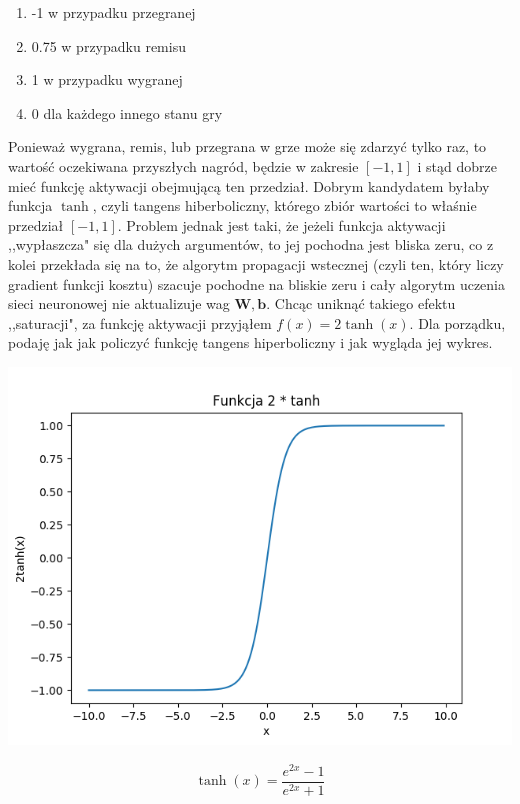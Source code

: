 \documentclass[licencjacka]{pracamgr}
\begin{document}
\begin{enumerate}
	\item{-1 w przypadku przegranej}
	\item{0.75 w przypadku remisu }
	\item{1 w przypadku wygranej}
	\item{0 dla każdego innego stanu gry}
\end{enumerate}

Ponieważ wygrana, remis, lub przegrana w grze może się zdarzyć tylko raz, to wartość oczekiwana przyszłych nagród, będzie w zakresie  $[-1,1]$ i  stąd dobrze mieć funkcję aktywacji obejmującą ten przedział. Dobrym kandydatem byłaby funkcja $\tanh$, czyli tangens hiberboliczny, którego zbiór wartości to właśnie przedział $[-1,1]$. Problem jednak jest taki, że jeżeli funkcja aktywacji ,,wypłaszcza" się dla dużych argumentów, to jej pochodna jest bliska zeru, co z kolei przekłada się na to, że algorytm propagacji wstecznej (czyli ten, który liczy gradient funkcji kosztu) szacuje pochodne na bliskie zeru i cały algorytm uczenia sieci neuronowej nie aktualizuje wag $\mathbf{W}, \mathbf{b}$. Chcąc uniknąć takiego efektu ,,saturacji", za funkcję aktywacji przyjąłem $f(x) = 2\tanh(x)$. Dla porządku, podaję jak jak policzyć funkcję tangens hiperboliczny i jak wygląda jej wykres.

\begin{flushleft}
	\includegraphics [scale=0.5]{tanh.png}
\end{flushleft}

\begin{equation}
	\tanh(x) = \frac{e^{2x} - 1}{e^{2x} + 1}
\end{equation}
\end{document}
